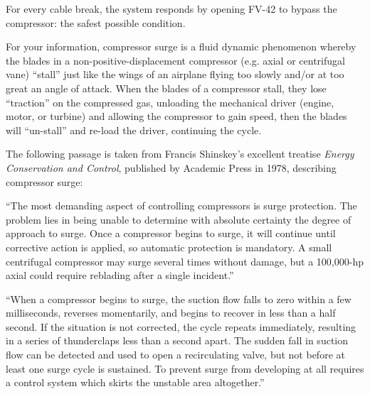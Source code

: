 





For every cable break, the system responds by opening FV-42 to bypass the compressor: the safest possible condition.

\vskip 10pt

For your information, compressor surge is a fluid dynamic phenomenon whereby the blades in a non-positive-displacement compressor (e.g. axial or centrifugal vane) ``stall'' just like the wings of an airplane flying too slowly and/or at too great an angle of attack.  When the blades of a compressor stall, they lose ``traction'' on the compressed gas, unloading the mechanical driver (engine, motor, or turbine) and allowing the compressor to gain speed, then the blades will ``un-stall'' and re-load the driver, continuing the cycle.

The following passage is taken from Francis Shinskey's excellent treatise {\it Energy Conservation and Control}, published by Academic Press in 1978, describing compressor surge:

\vskip 10pt {\narrower \noindent \baselineskip5pt

``The most demanding aspect of controlling compressors is surge protection.  The problem lies in being unable to determine with absolute certainty the degree of approach to surge.  Once a compressor begins to surge, it will continue until corrective action is applied, so automatic protection is mandatory.  A small centrifugal compressor may surge several times without damage, but a 100,000-hp axial could require reblading after a single incident.''

\vskip 5pt

``When a compressor begins to surge, the suction flow falls to zero within a few milliseconds, reverses momentarily, and begins to recover in less than a half second.  If the situation is not corrected, the cycle repeats immediately, resulting in a series of thunderclaps less than a second apart.  The sudden fall in suction flow can be detected and used to open a recirculating valve, but not before at least one surge cycle is sustained.  To prevent surge from developing at all requires a control system which skirts the unstable area altogether.''

\par} \vskip 10pt







